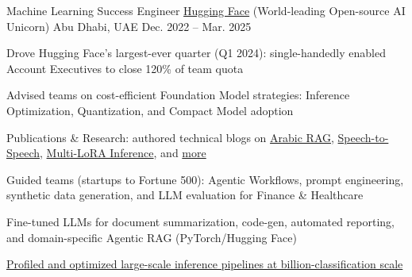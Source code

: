 \begin{cventries}
  \cventry
    {Machine Learning Success Engineer} %
    {\href{https://www.huggingface.co/}{Hugging Face} (World-leading Open-source AI Unicorn)} %
    {Abu Dhabi, UAE} %
    {Dec. 2022 -- Mar. 2025} %
    {
      \begin{cvitems}
        \item {}
      \end{cvitems}
      \vspace{2mm}
      \begin{cvsubentries}
      \end{cvsubentries}
      \vspace{4mm}
      \begin{cvitems} %
        \item {Drove Hugging Face's largest-ever quarter (Q1 2024): single-handedly enabled Account Executives to close 120\% of team quota}
        \item {Advised teams on cost-efficient Foundation Model strategies: Inference Optimization, Quantization, and Compact Model adoption}
        \item {Publications \& Research: authored technical blogs on \href{https://datavistics.github.io/posts/arabic-rag-1/}{Arabic RAG}, \href{https://huggingface.co/spaces/derek-thomas/fawkes}{Speech-to-Speech}, \href{https://huggingface.co/spaces/derek-thomas/fawkes}{Multi-LoRA Inference}, and \href{https://datavistics.github.io}{more}}
      \end{cvitems}
      \vspace{2mm}
      \begin{cvsubentries}
      \end{cvsubentries}
      \vspace{4mm}
      \begin{cvitems}
        \item {Guided teams (startups to Fortune 500): Agentic Workflows, prompt engineering, synthetic data generation, and LLM evaluation for Finance \& Healthcare}
        \item {Fine-tuned LLMs for document summarization, code-gen, automated reporting, and domain-specific Agentic RAG (PyTorch/Hugging Face)}
        \item {\href{https://huggingface.co/blog/billion-classifications}{Profiled and optimized large-scale inference pipelines at billion-classification scale}}

\end{cvitems}}
\end{cventries}
